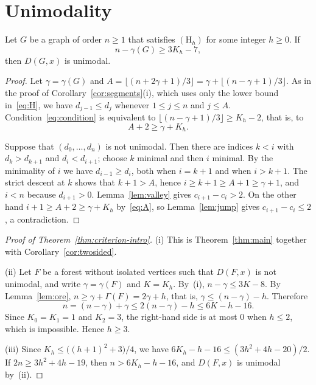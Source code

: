 \documentclass[smallextended,envcountsect,envcountsame]{svjour3}
\begin{document}
\section{Unimodality}\label{sec:unimodal}

\begin{theorem}\label{thm:main}
Let $G$ be a graph of order $n\ge1$ that satisfies $(\mathrm{H}_h)$ for some
integer $h\ge0$. If
\begingroup\small\begin{equation}\label{eq:condition}
  n-\gamma(G)\ge 3K_h-7 ,
\end{equation}\endgroup
then $D(G,x)$ is unimodal.
\end{theorem}

\begin{proof}
Let $\gamma=\gamma(G)$ and $A=\lfloor(n+2\gamma+1)/3\rfloor
=\gamma+\lfloor(n-\gamma+1)/3\rfloor$. As in the proof of
Corollary~\ref{cor:segments}(i), which uses only the lower bound
in~\eqref{eq:H}, we have $d_{j-1}\le d_j$ whenever $1\le j\le n$ and $j\le A$.
Condition~\eqref{eq:condition} is equivalent to
$\lfloor(n-\gamma+1)/3\rfloor\ge K_h-2$, that is, to
\begingroup\small\begin{equation}\label{eq:A}
  A+2\ge\gamma+K_h .
\end{equation}\endgroup

Suppose that $(d_0,\dots,d_n)$ is not unimodal. Then there are indices $k<i$
with $d_k>d_{k+1}$ and $d_i<d_{i+1}$; choose $k$ minimal and then $i$ minimal.
By the minimality of $i$ we have $d_{i-1}\ge d_i$, both when $i=k+1$ and when
$i>k+1$. The strict descent at $k$ shows that $k+1>A$, hence $i\ge k+1\ge
A+1\ge\gamma+1$, and $i<n$ because $d_{i+1}>0$. Lemma~\ref{lem:valley}
gives $c_{i+1}-c_i>2$. On the other hand $i+1\ge A+2\ge\gamma+K_h$
by~\eqref{eq:A}, so Lemma~\ref{lem:jump} gives $c_{i+1}-c_i\le2$, a
contradiction.
\end{proof}

\begin{proof}[Proof of Theorem~\ref{thm:criterion-intro}]
(i) This is Theorem~\ref{thm:main} together with
Corollary~\ref{cor:twosided}.

(ii) Let $F$ be a forest without isolated vertices such that $D(F,x)$ is not
unimodal, and write $\gamma=\gamma(F)$ and $K=K_h$. By~(i),
$n-\gamma\le 3K-8$. By Lemma~\ref{lem:ore}, $n\ge\gamma+\Gamma(F)=2\gamma+h$,
that is, $\gamma\le(n-\gamma)-h$. Therefore
\begingroup\small\[
  n=(n-\gamma)+\gamma\le 2(n-\gamma)-h\le 6K-h-16 .
\]\endgroup
Since $K_0=K_1=1$ and $K_2=3$, the right-hand side is at most $0$ when
$h\le2$, which is impossible. Hence $h\ge3$.

(iii) Since $K_h\le\bigl((h+1)^2+3\bigr)/4$, we have
$6K_h-h-16\le(3h^2+4h-20)/2$. If $2n\ge3h^2+4h-19$, then $n>6K_h-h-16$, and
$D(F,x)$ is unimodal by~(ii).
\end{proof}
\end{document}
